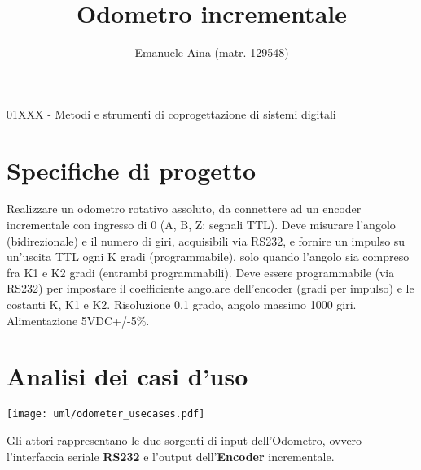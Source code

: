 \documentclass [11pt,a4paper,oneside]{article}
\title{Odometro incrementale}
\author{Emanuele Aina (matr. 129548)}
\date{}
\begin{document}
\maketitle

\begin{center}
\small{01XXX - Metodi e strumenti di coprogettazione di sistemi digitali }
\end{center}

\section{Specifiche di progetto}
Realizzare un odometro rotativo assoluto, da connettere ad un encoder
incrementale con ingresso di 0 (A, B, Z: segnali TTL). Deve misurare l'angolo
(bidirezionale) e il numero di giri, acquisibili via RS232, e fornire un
impulso su un'uscita TTL ogni K gradi (programmabile), solo quando l'angolo
sia compreso fra K1 e K2 gradi (entrambi programmabili). Deve essere
programmabile (via RS232) per impostare il coefficiente angolare dell'encoder
(gradi per impulso) e le costanti K, K1 e K2. Risoluzione 0.1 grado, angolo
massimo 1000 giri. Alimentazione 5VDC+/-5\%.

\section{Analisi dei casi d'uso}
\begin{center}
    \texttt{[image: uml/odometer\_usecases.pdf]}
    \label{usecases}
\end{center}

Gli attori rappresentano le due sorgenti di input dell'Odometro,
ovvero l'interfaccia seriale \textbf{RS232} e l'output
dell'\textbf{Encoder} incrementale.
\end{document}
